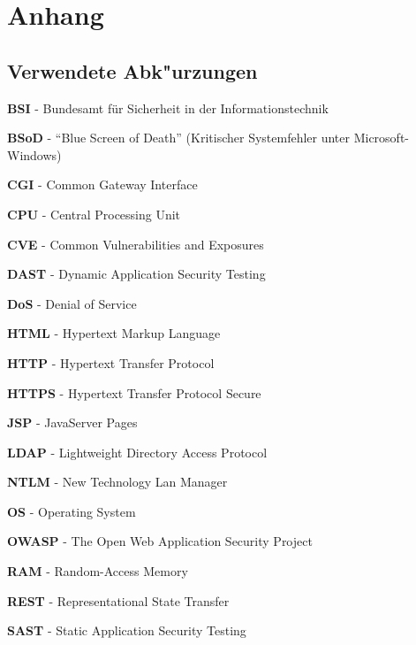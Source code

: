 \documentclass[12pt,oneside,a4paper,parskip]{scrbook}
\begin{document}
\backmatter



\cleardoublepage
{}
{}
\printbibliography[title=Quellenverzeichnis]

\appendix
  \chapter{Anhang}


  \section{Verwendete Abk"urzungen}
  \textbf{BSI} - Bundesamt für Sicherheit in der Informationstechnik

  \textbf{BSoD} - ``Blue Screen of Death'' (Kritischer Systemfehler unter Microsoft-Windows)

  \textbf{CGI} - Common Gateway Interface

  \textbf{CPU} - Central Processing Unit

  \textbf{CVE} - Common Vulnerabilities and Exposures

  \textbf{DAST} - Dynamic Application Security Testing

  \textbf{DoS} - Denial of Service

  \textbf{HTML} - Hypertext Markup Language

  \textbf{HTTP} - Hypertext Transfer Protocol

  \textbf{HTTPS} - Hypertext Transfer Protocol Secure

  \textbf{JSP} - JavaServer Pages

  \textbf{LDAP} - Lightweight Directory Access Protocol

  \textbf{NTLM} - New Technology Lan Manager

  \textbf{OS} - Operating System

  \textbf{OWASP} - The Open Web Application Security Project

  \textbf{RAM} - Random-Access Memory

  \textbf{REST} - Representational State Transfer

  \textbf{SAST} - Static Application Security Testing
\end{document}
